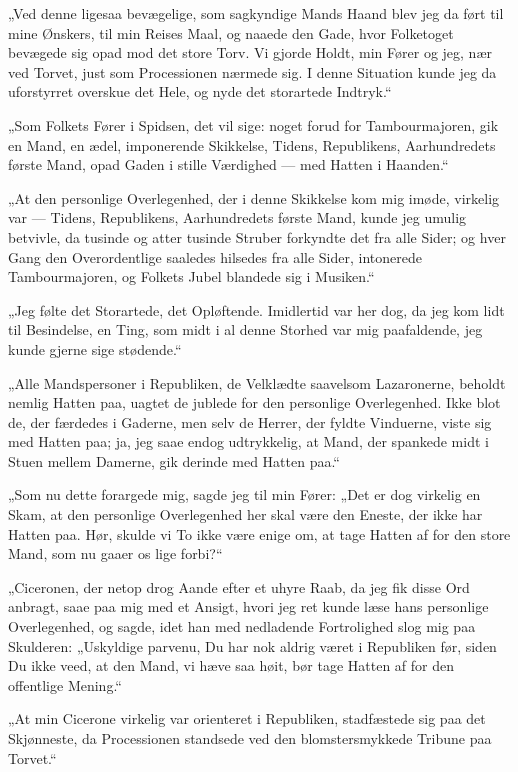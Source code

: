 \documentclass[12pt,a4paper]{book}
\newcommand{\apage}[1]{\marginnote{\footnotesize\textit{[#1]}}}
\begin{document}
„Ved denne ligesaa bevægelige, som sagkyndige Mands Haand blev jeg da
ført til mine Ønskers, til min Reises Maal, og naaede den Gade, hvor
Folketoget bevægede sig opad mod det store Torv. Vi gjorde Holdt, min
Fører og jeg, nær ved Torvet, just som Processionen nærmede sig. I \apage{58}
denne Situation kunde jeg da uforstyrret overskue det Hele, og nyde
det storartede Indtryk.“

„Som Folkets Fører i Spidsen, det vil sige: noget forud for
Tambourmajoren, gik en Mand, en ædel, imponerende Skikkelse, Tidens,
Republikens, Aarhundredets første Mand, opad Gaden i stille
Værdighed --- med Hatten i Haanden.“

„At den personlige Overlegenhed, der i denne Skikkelse kom mig
imøde, virkelig var --- Tidens, Republikens, Aarhundredets første
Mand, kunde jeg umulig betvivle, da tusinde og atter tusinde Struber
forkyndte det fra alle Sider; og hver Gang den Overordentlige
saaledes hilsedes fra alle Sider, intonerede Tambourmajoren, og
Folkets Jubel blandede sig i Musiken.“

„Jeg følte det Storartede, det Opløftende. Imidlertid var her dog, da
jeg kom lidt til Besindelse, en Ting, som midt i al denne Storhed var
mig paafaldende, jeg kunde gjerne sige stødende.“

„Alle Mandspersoner i Republiken, de Velklædte saavelsom
Lazaronerne, beholdt nemlig Hatten paa, uagtet de jublede for den
personlige Overlegenhed. Ikke blot de, der færdedes i Gaderne, men
selv de Herrer, der fyldte Vinduerne, viste sig med Hatten paa; ja,
jeg saae endog udtrykkelig, at Mand, der spankede midt i Stuen mellem
Damerne, gik derinde med Hatten paa.“

„Som nu dette forargede mig, sagde jeg til min Fører: „Det er dog
virkelig en Skam, at den personlige Overlegenhed her skal være den
Eneste, der ikke har Hatten paa. Hør, skulde vi To ikke være enige
om, at tage Hatten af for den store Mand, som nu gaaer os lige
forbi?“

„Ciceronen, der netop drog Aande efter et uhyre Raab, da jeg fik
disse Ord anbragt, saae paa mig med et Ansigt, hvori jeg ret kunde
læse hans personlige Overlegenhed, og sagde, idet han med nedladende
Fortrolighed slog mig paa Skulderen: „Uskyldige parvenu, Du har nok
aldrig været \apage{59} i
Republiken før, siden Du ikke veed, at den Mand, vi hæve saa høit,
bør tage Hatten af for den offentlige Mening.“

„At min Cicerone virkelig var orienteret i Republiken, stadfæstede
sig paa det Skjønneste, da Processionen standsede ved den
blomstersmykkede Tribune paa Torvet.“
\end{document}
